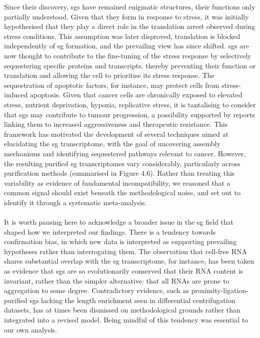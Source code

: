 Since their discovery, \glspl{sg} have remained enigmatic structures, their functions only partially understood. Given that they form in response to stress, it was initially hypothesised that they play a direct role in the translation arrest observed during stress conditions\cite{kedersha_g3bpcaprin1usp10_2016}. This assumption was later disproved, translation is blocked independently of \gls{sg} formation\cite{kedersha_g3bpcaprin1usp10_2016}, and the prevailing view has since shifted. \glspl{sg} are now thought to contribute to the fine-tuning of the stress response by selectively sequestering specific proteins and transcripts, thereby preventing their function or translation and allowing the cell to prioritise its stress response\cite{fujikawa_stress_2023, omer_stress_2018, park_stress_2017}. The sequestration of apoptotic factors, for instance, may protect cells from stress-induced apoptosis\cite{fujikawa_stress_2023}. Given that cancer cells are chronically exposed to elevated stress, nutrient deprivation, hypoxia, replicative stress, it is tantalising to consider that \glspl{sg} may contribute to tumour progression\cite{anderson_stress_2015, szaflarski_vinca_2016, moeller_radiation_2004}, a possibility supported by reports linking them to increased aggressiveness and therapeutic resistance\cite{somasekharan_yb-1_2015, grabocka_mutant_2016}.
This framework has motivated the development of several techniques aimed at elucidating the \gls{sg} transcriptome, with the goal of uncovering assembly mechanisms and identifying sequestered pathways relevant to cancer. However, the resulting purified \gls{sg} transcriptomes vary considerably, particularly across purification methods (summarised in Figure 4.6). Rather than treating this variability as evidence of fundamental incompatibility, we reasoned that a common signal should exist beneath the methodological noise, and set out to identify it through a systematic meta-analysis.
\\
\\
It is worth pausing here to acknowledge a broader issue in the \gls{sg} field that shaped how we interpreted our findings. There is a tendency towards confirmation bias, in which new data is interpreted as supporting prevailing hypotheses rather than interrogating them. The observation that cell-free RNA shares substantial overlap with the \gls{sg} transcriptome\cite{van_treeck_rna_2018}, for instance, has been taken as evidence that \glspl{sg} are so evolutionarily conserved that their RNA content is invariant\cite{van_treeck_rna_2018}, rather than the simpler alternative: that all RNAs are prone to aggregation to some degree\cite{glauninger_transcriptome-wide_2025}. Contradictory evidence, such as proximity-ligation-purified \glspl{sg} lacking the length enrichment seen in differential centrifugation datasets, has at times been dismissed on methodological grounds rather than integrated into a revised model\cite{somasekharan_g3bp1-linked_2020}. Being mindful of this tendency was essential to our own analysis.

